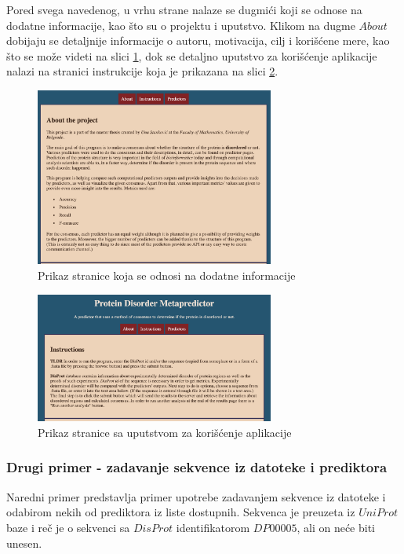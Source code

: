 Pored svega navedenog, u vrhu strane nalaze se dugmići koji se odnose na dodatne informacije, kao što su o projektu i uputstvo. Klikom na dugme $About$ dobijaju se detaljnije informacije o autoru, motivacija, cilj i korišćene mere, kao što se može videti na slici \ref{fig:about}, dok se detaljno uputstvo za korišćenje aplikacije nalazi na stranici instrukcije koja je prikazana na slici  \ref{fig:instr}.
\begin{figure}[H]
	\centering
    \includegraphics[width=0.7\textwidth]{Figures/App/about.png}
    \caption{Prikaz stranice koja se odnosi na dodatne informacije}
    \label{fig:about}
\end{figure}
\begin{figure}[H]
	\centering
    \includegraphics[width=0.7\textwidth]{Figures/App/instructions.png}
    \caption{Prikaz stranice sa uputstvom za korišćenje aplikacije}
    \label{fig:instr}
\end{figure}

\subsubsection{Drugi primer - zadavanje sekvence iz datoteke i prediktora}
Naredni primer predstavlja primer upotrebe zadavanjem sekvence iz datoteke i odabirom nekih od prediktora iz liste dostupnih. Sekvenca je preuzeta iz $UniProt$ baze i reč je o sekvenci sa $DisProt$ identifikatorom $DP00005$, ali on neće biti unesen.\\


